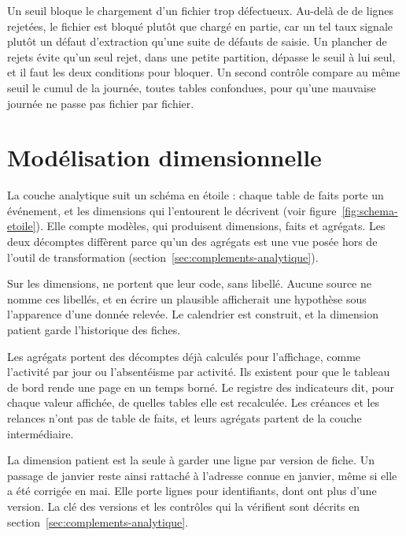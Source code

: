 Un seuil bloque le chargement d'un fichier trop défectueux. Au-delà de
 de lignes rejetées, le fichier est bloqué plutôt que chargé en partie,
car un tel taux signale plutôt un défaut d'extraction qu'une suite de défauts de saisie. Un plancher
de  rejets évite qu'un seul rejet, dans une petite partition, dépasse le
seuil à lui seul, et il faut les deux conditions pour bloquer. Un second contrôle compare au même
seuil le cumul de la journée, toutes tables confondues, pour qu'une mauvaise journée ne passe pas
fichier par fichier.

\section{Modélisation dimensionnelle}

La couche analytique suit un schéma en étoile : chaque table de faits porte un événement, et les
dimensions qui l'entourent le décrivent (voir figure~\ref{fig:schema-etoile}). Elle compte
 modèles, qui produisent  dimensions,
 faits et  agrégats. Les deux décomptes diffèrent parce qu'un des
agrégats est une vue posée hors de l'outil de transformation (section~\ref{sec:complements-analytique}).

Sur les  dimensions,  ne portent que leur code, sans libellé. Aucune source ne nomme ces
libellés, et en écrire un plausible afficherait une hypothèse sous l'apparence d'une donnée
relevée. Le calendrier est construit, et la dimension patient garde l'historique des fiches.

Les agrégats portent des décomptes déjà calculés pour l'affichage, comme l'activité par jour ou
l'absentéisme par activité. Ils existent pour que le tableau de bord rende une page en un temps
borné. Le registre des indicateurs dit, pour chaque valeur affichée, de quelles tables elle est
recalculée. Les créances et les relances n'ont pas de table de faits, et leurs agrégats partent de
la couche intermédiaire.

La dimension patient est la seule à garder une ligne par version de fiche. Un passage de janvier
reste ainsi rattaché à l'adresse connue en janvier, même si elle a été corrigée en mai. Elle porte
 lignes pour  identifiants, dont
 ont plus d'une version. La clé des versions et les  contrôles qui la vérifient sont décrits en section~\ref{sec:complements-analytique}.

